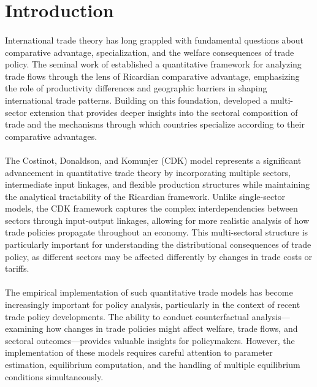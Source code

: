 \section{Introduction}

\paragraph{} International trade theory has long grappled with fundamental questions about comparative advantage, specialization, and the welfare consequences of trade policy. The seminal work of \cite{eaton2002Econometrica} established a quantitative framework for analyzing trade flows through the lens of Ricardian comparative advantage, emphasizing the role of productivity differences and geographic barriers in shaping international trade patterns. Building on this foundation, \cite{costinot2012TheReviewofEconomicStudies} developed a multi-sector extension that provides deeper insights into the sectoral composition of trade and the mechanisms through which countries specialize according to their comparative advantages.

\paragraph{} The Costinot, Donaldson, and Komunjer (CDK) model represents a significant advancement in quantitative trade theory by incorporating multiple sectors, intermediate input linkages, and flexible production structures while maintaining the analytical tractability of the Ricardian framework. Unlike single-sector models, the CDK framework captures the complex interdependencies between sectors through input-output linkages, allowing for more realistic analysis of how trade policies propagate throughout an economy. This multi-sectoral structure is particularly important for understanding the distributional consequences of trade policy, as different sectors may be affected differently by changes in trade costs or tariffs.

\paragraph{} The empirical implementation of such quantitative trade models has become increasingly important for policy analysis, particularly in the context of recent trade policy developments. The ability to conduct counterfactual analysis—examining how changes in trade policies might affect welfare, trade flows, and sectoral outcomes—provides valuable insights for policymakers. However, the implementation of these models requires careful attention to parameter estimation, equilibrium computation, and the handling of multiple equilibrium conditions simultaneously.

